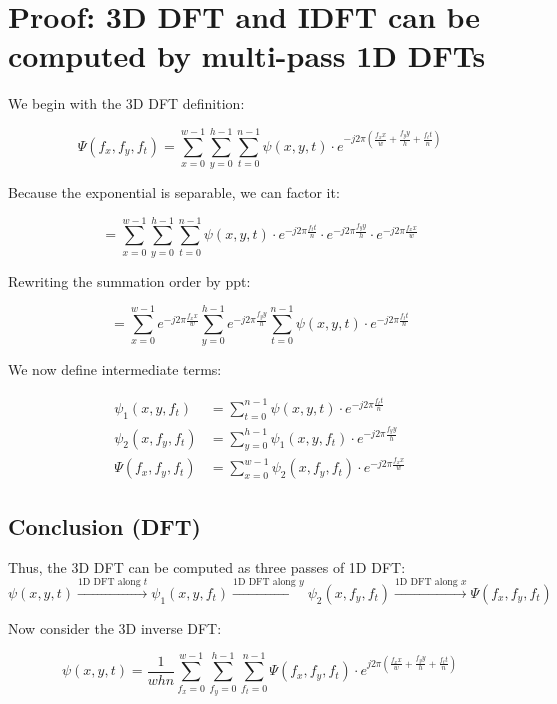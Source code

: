 \documentclass{article}
\begin{document}
\section*{Proof: 3D DFT and IDFT can be computed by multi-pass 1D DFTs}

We begin with the 3D DFT definition:

\[
\Psi(f_x, f_y, f_t) = \sum_{x=0}^{w-1} \sum_{y=0}^{h-1} \sum_{t=0}^{n-1} \psi(x, y, t) \cdot e^{-j 2\pi \left( \frac{f_x x}{w} + \frac{f_y y}{h} + \frac{f_t t}{n} \right)}
\]

Because the exponential is separable, we can factor it:

\[
= \sum_{x=0}^{w-1} \sum_{y=0}^{h-1} \sum_{t=0}^{n-1} \psi(x, y, t) \cdot
e^{-j 2\pi \frac{f_t t}{n}} \cdot
e^{-j 2\pi \frac{f_y y}{h}} \cdot
e^{-j 2\pi \frac{f_x x}{w}}
\]

Rewriting the summation order by ppt:

\[
= \sum_{x=0}^{w-1} e^{-j 2\pi \frac{f_x x}{w}} 
\sum_{y=0}^{h-1} e^{-j 2\pi \frac{f_y y}{h}} 
\sum_{t=0}^{n-1} \psi(x, y, t) \cdot e^{-j 2\pi \frac{f_t t}{n}}
\]

We now define intermediate terms:

\begin{align*}
\psi_1(x, y, f_t) &= \sum_{t=0}^{n-1} \psi(x, y, t) \cdot e^{-j 2\pi \frac{f_t t}{n}} \\
\psi_2(x, f_y, f_t) &= \sum_{y=0}^{h-1} \psi_1(x, y, f_t) \cdot e^{-j 2\pi \frac{f_y y}{h}} \\
\Psi(f_x, f_y, f_t) &= \sum_{x=0}^{w-1} \psi_2(x, f_y, f_t) \cdot e^{-j 2\pi \frac{f_x x}{w}}
\end{align*}

\subsection*{Conclusion (DFT)}

Thus, the 3D DFT can be computed as three passes of 1D DFT:
\[
\psi(x, y, t) \xrightarrow{\text{1D DFT along } t} \psi_1(x, y, f_t)
\xrightarrow{\text{1D DFT along } y} \psi_2(x, f_y, f_t)
\xrightarrow{\text{1D DFT along } x} \Psi(f_x, f_y, f_t)
\]

\bigskip

Now consider the 3D inverse DFT:

\[
\psi(x, y, t) = \frac{1}{whn} \sum_{f_x=0}^{w-1} \sum_{f_y=0}^{h-1} \sum_{f_t=0}^{n-1} \Psi(f_x, f_y, f_t) \cdot e^{j 2\pi \left( \frac{f_x x}{w} + \frac{f_y y}{h} + \frac{f_t t}{n} \right)}
\]
\end{document}

